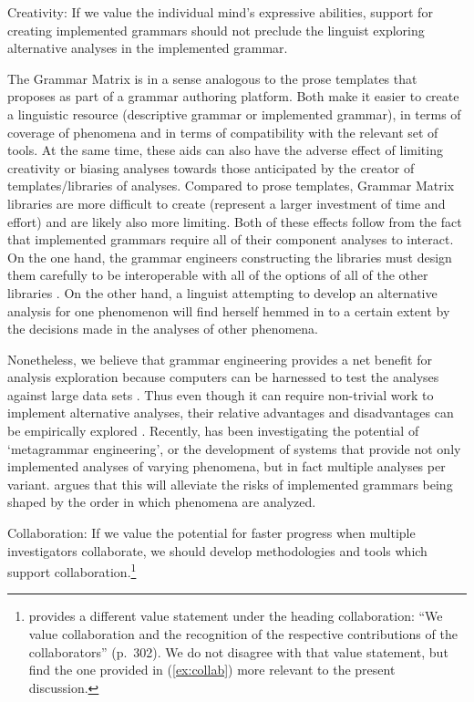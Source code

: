 \documentclass[12pt]{article}
\begin{document}
\begin{exe}
\ex\label{ex:cr} {\sc Creativity}: If we value the individual mind's expressive
abilities, support for creating implemented grammars should
not preclude the linguist exploring alternative analyses in the
implemented grammar.
\end{exe}

The Grammar Matrix is in a sense analogous to the prose templates
that \citeauthor{Nordhoff:08} proposes as part of a grammar authoring
platform.  Both make it easier to create a linguistic resource
(descriptive grammar or implemented grammar), in terms of coverage
of phenomena and in terms of compatibility with the relevant set of
tools.  At the same time, these aids can also have the adverse effect
of limiting creativity or biasing analyses towards those anticipated
by the creator of templates/libraries of analyses.  Compared to prose
templates, Grammar Matrix libraries are more difficult to create
(represent a larger investment of time and effort) and are likely also more limiting.  Both
of these effects follow from the fact that implemented grammars 
require all of their component analyses to interact.  On the one hand,
the grammar engineers constructing the libraries must design them
carefully to be interoperable with all of the options of all of
the other libraries \cite[Ch.\ 2]{Drellishak:09}.  On the other
hand, a linguist attempting to develop an alternative analysis for
one phenomenon will find herself hemmed in to a certain extent by
the decisions made in the analyses of other phenomena.

Nonetheless, we believe that grammar engineering provides a net
benefit for analysis exploration because computers can be harnessed to
test the analyses against large data sets
\cite{Bender:08,Ben:Fli:Oep:11}.  Thus even though it can require
non-trivial work to implement alternative analyses, their relative
advantages and disadvantages can be empirically explored
\cite{Bender:10}.  Recently,  has been investigating
the potential of `metagrammar engineering', or the development of
systems that provide not only implemented analyses of varying
phenomena, but in fact multiple analyses per variant.
\citeauthor{Fokkens:11} argues that this will alleviate the risks of
implemented grammars being shaped by the order in which phenomena are
analyzed.

\begin{exe}
\ex\label{ex:collab} {\sc Collaboration:} If we value the potential
for faster progress when multiple investigators collaborate, we should
develop methodologies and tools which support
collaboration.\footnote{\citeauthor{Nordhoff:08} provides a different
  value statement under the heading collaboration: ``We value
  collaboration and the recognition of the respective contributions of
  the collaborators'' (p.\ 302).  We do not disagree with that value
  statement, but find the one provided in (\ref{ex:collab}) more
  relevant to the present discussion.}
\end{exe}
\end{document}
